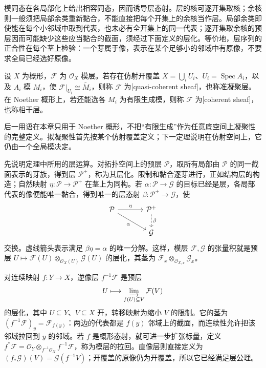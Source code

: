 \ProseParagraphBreak
模同态在各局部化上给出相容同态，因而诱导层态射。层的核可逐开集取核；余核则一般须把局部余类重新黏合，不能直接把每个开集上的余核当作层。局部余类即使能在每个小邻域中取到代表，也未必有全开集上的同一代表；逐开集取余核的预层因而可能缺少这些应当黏合的截面，须经过下面定义的层化。等价地，层序列的正合性在每个茎上检验：一个芽属于像，表示在某个足够小的邻域中有原像，不要求全局已经选好原像。

\begin{definition}\label{b3:def:quasicoherent-sheaf}
	设 \(X\) 为概形，\(\mathcal F\) 为 \(\mathcal O_X\) 模层。若存在仿射开覆盖 \(X=\bigcup_iU_i\)、\(U_i=\operatorname{Spec}A_i\)，以及 \(A_i\) 模 \(M_i\)，使 \(\mathcal F|_{U_i}\cong\widetilde{M_i}\)，则称 \(\mathcal F\) 为[quasi-coherent sheaf]，也称准凝聚层。在 Noether 概形上，若还能选各 \(M_i\) 为有限生成模，则称 \(\mathcal F\) 为[coherent sheaf]，也称相干层。
\end{definition}

后一用语在本章只用于 Noether 概形，不把“有限生成”作为任意底空间上凝聚性的完整定义。拟凝聚性首先按某个仿射覆盖定义；下一定理说明在仿射空间上，它仍由一个全局模决定。

\ProseParagraphBreak
先说明定理中所用的层运算。对拓扑空间上的预层 \(\mathcal P\)，取所有局部由 \(\mathcal P\) 的同一截面表示的芽族，得到层 \(\mathcal P^+\)，称为其层化。限制和黏合逐芽进行，正如结构层的构造；自然映射 \(\eta:\mathcal P\rightarrow\mathcal P^+\) 在茎上为同构。若 \(\alpha:\mathcal P\rightarrow\mathcal G\) 的目标已经是层，各局部代表的像便能唯一黏合，得到唯一的层态射 \(\beta:\mathcal P^+\to\mathcal G\)，使
\[
	\begin{tikzcd}[column sep=large]
		\mathcal P\arrow[r,"\eta"]\arrow[dr,"\alpha"'] &\mathcal P^+\arrow[d,dashed,"\beta"]\\
		&\mathcal G
	\end{tikzcd}
\]
交换。虚线箭头表示满足 \(\beta\eta=\alpha\) 的唯一分解。这样，模层 \(\mathcal F,\mathcal G\) 的张量积就是预层 \(U\mapsto\mathcal F(U)\otimes_{\mathcal O_X(U)}\mathcal G(U)\) 的层化，其茎为 \(\mathcal F_x\otimes_{\mathcal O_{X,x}}\mathcal G_x\)。

\ProseParagraphBreak
对连续映射 \(f:Y\rightarrow X\)，逆像层 \(f^{-1}\mathcal F\) 是预层
\[
	U\longmapsto\varinjlim_{f(U)\subseteq V}\mathcal F(V)
\]
的层化，其中 \(U\subseteq Y\)、\(V\subseteq X\) 开，转移映射为缩小 \(V\) 的限制。它的茎为 \((f^{-1}\mathcal F)_y=\mathcal F_{f(y)}\)：两边的代表都是 \(f(y)\) 邻域上的截面，而连续性允许把该邻域拉回到 \(y\) 的邻域。若 \(f\) 是概形态射，就可进一步扩张标量，定义 \(f^*\mathcal F=\mathcal O_Y\otimes_{f^{-1}\mathcal O_X}f^{-1}\mathcal F\)，称为模层的拉回。直像层则直接定义为 \((f_*\mathcal G)(V)=\mathcal G(f^{-1}V)\)；开覆盖的原像仍为开覆盖，所以它已经满足层公理。


